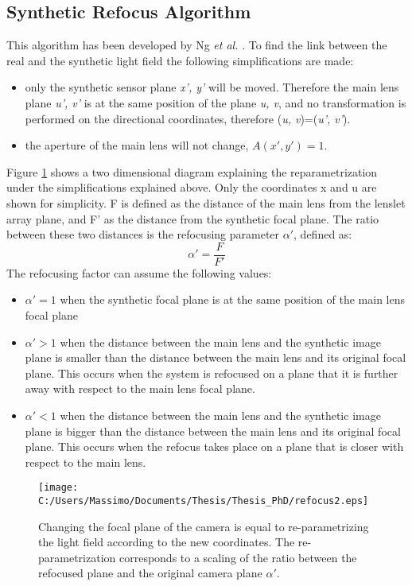  \subsection{Synthetic Refocus Algorithm}
 This algorithm has been developed by Ng \textit{et al.} \cite{ng2005light}. To find the link between the real and the synthetic light field the following simplifications are made: 
 \begin{itemize}
 	\item only the synthetic sensor plane \textit{x', y'} will be moved. Therefore the main lens plane \textit{u', v'} is at the same position of the plane \textit{u, v}, and no transformation is performed on the directional coordinates, therefore (\textit{u, v})=(\textit{u', v'}).
 	\item the aperture of the main lens will not change, $A(x', y')=1$.
 \end{itemize} 
 Figure \ref{fig:synthetic3} shows a two dimensional diagram explaining the reparametrization under the simplifications explained above. Only the coordinates x and u are shown for simplicity. F is defined as the distance of the main lens from the lenslet array plane, and F' as the distance from the synthetic focal plane. The ratio between these two distances is the refocusing parameter $ \alpha'$, defined as: 
 \begin{equation}
 	\label{eq:alpha}
 	 \alpha' = \dfrac{F}{F'}
 \end{equation}
 The refocusing factor can assume the following values:
 \begin{itemize}
 	\item $ \alpha'=1$ when the synthetic focal plane is at the same position of the main lens focal plane
 	\item $ \alpha'>1$ when the distance between the main lens and the synthetic 
 	image plane is smaller than the distance between the main lens and its original focal plane. This occurs when the system is refocused on a plane that it is further away with respect to the main lens focal plane.
 	\item $ \alpha'<1$ when the distance between the main lens and the synthetic image plane is bigger than the distance between the main lens and its original focal plane. This occurs when the refocus takes place on a plane that is closer with respect to the main lens.
 \end{itemize}
 \begin{figure}[H]
 	\centering
 	\texttt{[image: C:/Users/Massimo/Documents/Thesis/Thesis\_PhD/refocus2.eps]}
 	\caption{\label{fig:synthetic3} Changing the focal plane of the camera is equal to re-parametrizing the light field according to the new coordinates. The re-parametrization corresponds to a scaling of the ratio between the refocused plane and the original camera plane $ \alpha'$. }
 \end{figure}
